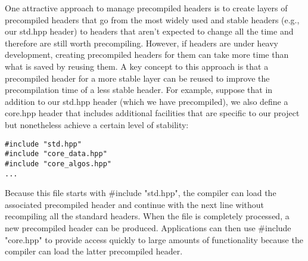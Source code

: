 One attractive approach to manage precompiled headers is to create layers of precompiled headers that go from the most widely used and stable headers (e.g., our std.hpp header) to headers that aren’t expected to change all the time and therefore are still worth precompiling. However, if headers are under heavy development, creating precompiled headers for them can take more time than what is saved by reusing them. A key concept to this approach is that a precompiled header for a more stable layer can be reused to improve the precompilation time of a less stable header. For example, suppose that in addition to our std.hpp header (which we have precompiled), we also define a core.hpp header that includes additional facilities that are specific to our project but nonetheless achieve a certain level of stability:

\begin{lstlisting}[style=styleCXX]
#include "std.hpp"
#include "core_data.hpp"
#include "core_algos.hpp"
...
\end{lstlisting}

Because this file starts with \#include "std.hpp", the compiler can load the associated precompiled header and continue with the next line without recompiling all the standard headers. When the file is completely processed, a new precompiled header can be produced. Applications can then use \#include "core.hpp" to provide access quickly to large amounts of functionality because the compiler can load the latter precompiled header.























